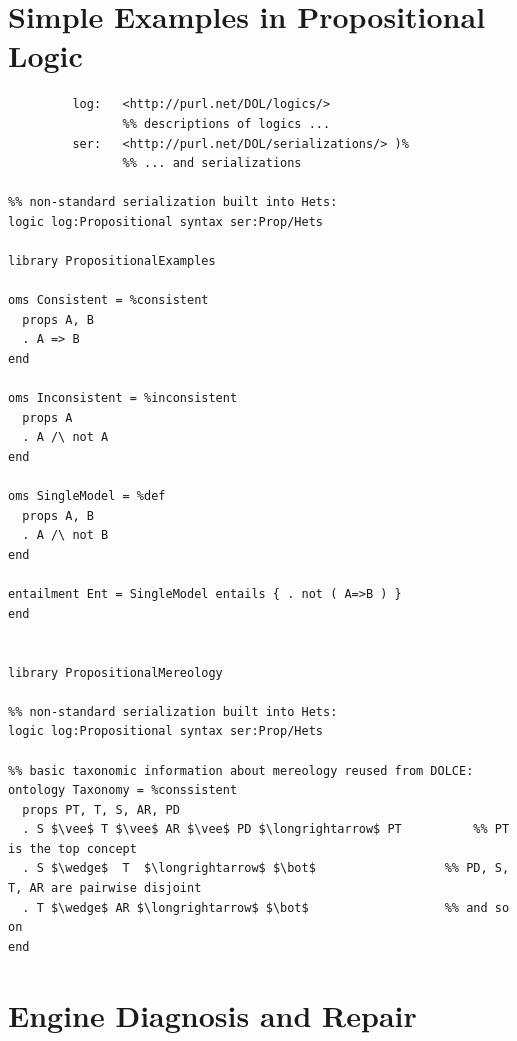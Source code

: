 \documentclass[10pt,fleqn,final]{scrreprt}
\newcommand{\sclause}[1]{\section{#1}}
\begin{document}
\sclause{Simple Examples in Propositional Logic}\label{ex:prop}
\begin{lstlisting}[basicstyle=\ttfamily,language=dolText,alsolanguage=prop,escapechar=@,mathescape]
%prefix( :      <http://www.example.org/prop#>
         log:   <http://purl.net/DOL/logics/>
                %% descriptions of logics ...
         ser:   <http://purl.net/DOL/serializations/> )%
                %% ... and serializations

%% non-standard serialization built into Hets: 
logic log:Propositional syntax ser:Prop/Hets       

library PropositionalExamples

oms Consistent = %consistent
  props A, B
  . A => B
end

oms Inconsistent = %inconsistent
  props A
  . A /\ not A
end

oms SingleModel = %def
  props A, B
  . A /\ not B
end

entailment Ent = SingleModel entails { . not ( A=>B ) }
end


library PropositionalMereology

%% non-standard serialization built into Hets: 
logic log:Propositional syntax ser:Prop/Hets       

%% basic taxonomic information about mereology reused from DOLCE:
ontology Taxonomy = %conssistent      
  props PT, T, S, AR, PD
  . S $\vee$ T $\vee$ AR $\vee$ PD $\longrightarrow$ PT          %% PT is the top concept
  . S $\wedge$  T  $\longrightarrow$ $\bot$                  %% PD, S, T, AR are pairwise disjoint
  . T $\wedge$ AR $\longrightarrow$ $\bot$                   %% and so on
end
\end{lstlisting}

\sclause{Engine Diagnosis and Repair}\label{ex:engine}
\end{document}
